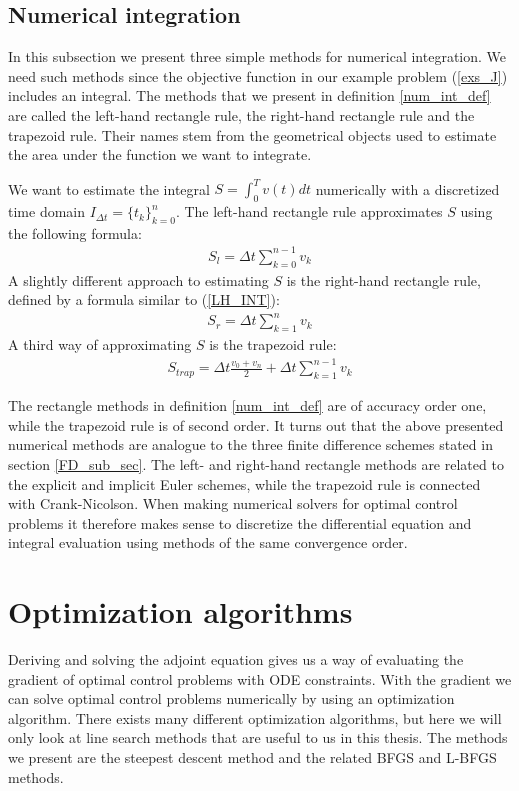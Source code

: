 \subsection{Numerical integration} \label{num_int_sub_sec}
In this subsection we present three simple methods for numerical integration. We need such methods since the objective function in our example problem (\ref{exs_J}) includes an integral. The methods that we present in definition \ref{num_int_def} are called the left-hand rectangle rule, the right-hand rectangle rule and the trapezoid rule. Their names stem from the geometrical objects used to estimate the area under the function we want to integrate.
\begin{definition} \label{num_int_def}
We want to estimate the integral $S=\int_0^T v(t) dt$ numerically with a discretized time domain $I_{\Delta t}=\{t_k\}_{k=0}^{n}$. The left-hand rectangle rule approximates $S$ using the following formula:
\begin{align}
S_l = \Delta t\sum_{k=0}^{n-1} v_k \label{LH_INT}
\end{align}
A slightly different approach to estimating $S$ is the right-hand rectangle rule, defined by a formula similar to (\ref{LH_INT}): 
\begin{align}
S_r = \Delta t\sum_{k=1}^{n} v_k \label{RH_INT}
\end{align}
A third way of approximating $S$ is the trapezoid rule:
\begin{align}
S_{trap} = \Delta t\frac{v_0+v_n}{2}+\Delta t\sum_{k=1}^{n-1} v_k \label{TRAP_INT}
\end{align}
\end{definition}
\noindent
The rectangle methods in definition \ref{num_int_def} are of accuracy order one, while the trapezoid rule is of second order. It turns out that the above presented numerical methods are analogue to the three finite difference schemes stated in section \ref{FD_sub_sec}. The left- and right-hand rectangle methods are related to the explicit and implicit Euler schemes, while the trapezoid rule is connected with Crank-Nicolson. When making numerical solvers for optimal control problems it therefore makes sense to discretize the differential equation and integral evaluation using methods of the same convergence order. 
\section{Optimization algorithms}
Deriving and solving the adjoint equation gives us a way of evaluating the gradient of optimal control problems with ODE constraints. With the gradient we can solve optimal control problems numerically by using an optimization algorithm. There exists many different optimization algorithms, but here we will only look at line search methods that are useful to us in this thesis. The methods we present are the steepest descent method and the related BFGS and L-BFGS methods.  
